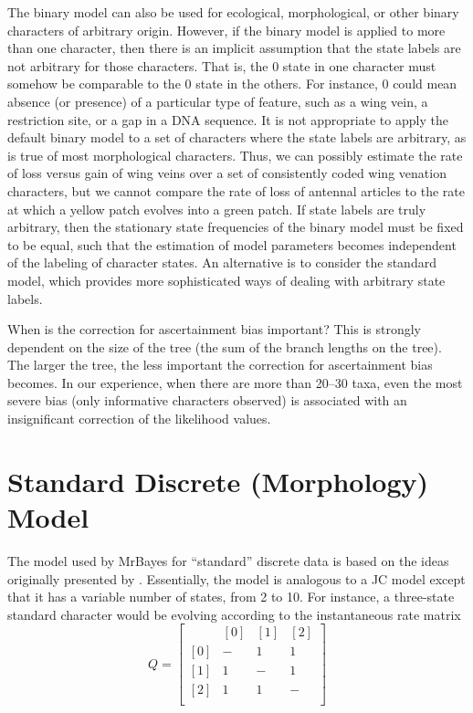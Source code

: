 \documentclass[12pt]{book}
\begin{document}
The binary model can also be used for ecological, morphological, or other binary characters of
arbitrary origin. However, if the binary model is applied to more than one character, then there is
an implicit assumption that the state labels are not arbitrary for those characters. That is, the 0
state in one character must somehow be comparable to the 0 state in the others. For instance, 0
could mean absence (or presence) of a particular type of feature, such as a wing vein, a
restriction site, or a gap in a DNA sequence. It is not appropriate to apply the default binary
model to a set of characters where the state labels are arbitrary, as is true of most morphological
characters. Thus, we can possibly estimate the rate of loss versus gain of wing veins over a set of
consistently coded wing venation characters, but we cannot compare the rate of loss of antennal
articles to the rate at which a yellow patch evolves into a green patch. If state labels are truly
arbitrary, then the stationary state frequencies of the binary model must be fixed to be equal,
such that the estimation of model parameters becomes independent of the labeling of character
states. An alternative is to consider the standard model, which provides more sophisticated ways of
dealing with arbitrary state labels.

When is the correction for ascertainment bias important? This is strongly dependent on the size of
the tree (the sum of the branch lengths on the tree). The larger the tree, the less important the
correction for ascertainment bias becomes. In our experience, when there are more than 20--30 taxa,
even the most severe bias (only informative characters observed) is associated with an
insignificant correction of the likelihood values.

\section{Standard Discrete (Morphology) Model}

The model used by MrBayes for ``standard'' discrete data is based on the ideas originally presented
by \citet{lewis01}. Essentially, the model is analogous to a JC model except that it has a variable
number of states, from 2 to 10. For instance, a three-state standard character would be evolving
according to the instantaneous rate matrix
\[
Q=\begin{bmatrix}
    & [0] & [1] & [2]\\
 [0]& - & 1 & 1\\
 [1]& 1& -  & 1\\
 [2]& 1& 1  & -\\
\end{bmatrix}
\]
\end{document}
